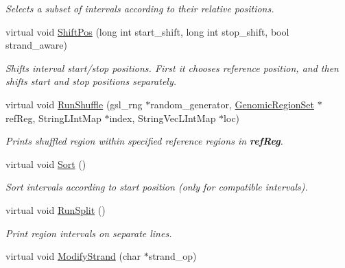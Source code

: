 \begin{CompactItemize}
\begin{CompactList}\small\item\em Selects a subset of intervals according to their relative positions. \item\end{CompactList}\item 
virtual void \hyperlink{classGenomicRegion_0ee8c165839c79afdc586f8b5e07788e}{ShiftPos} (long int start\_\-shift, long int stop\_\-shift, bool strand\_\-aware)
\begin{CompactList}\small\item\em Shifts interval start/stop positions. First it chooses reference position, and then shifts start and stop positions separately. \item\end{CompactList}\item 
\hypertarget{classGenomicRegion_b2c52ae40b34f3607f4558add94c25fd}{
virtual void \hyperlink{classGenomicRegion_b2c52ae40b34f3607f4558add94c25fd}{RunShuffle} (gsl\_\-rng $\ast$random\_\-generator, \hyperlink{classGenomicRegionSet}{GenomicRegionSet} $\ast$refReg, StringLIntMap $\ast$index, StringVecLIntMap $\ast$loc)}
\label{classGenomicRegion_b2c52ae40b34f3607f4558add94c25fd}

\begin{CompactList}\small\item\em Prints shuffled region within specified reference regions in {\bf refReg}. \item\end{CompactList}\item 
\hypertarget{classGenomicRegion_03959dc5b5695d817b5a40b47f30a4aa}{
virtual void \hyperlink{classGenomicRegion_03959dc5b5695d817b5a40b47f30a4aa}{Sort} ()}
\label{classGenomicRegion_03959dc5b5695d817b5a40b47f30a4aa}

\begin{CompactList}\small\item\em Sort intervals according to start position (only for compatible intervals). \item\end{CompactList}\item 
\hypertarget{classGenomicRegion_1686d4f4d2962b22d506a25a5887c31c}{
virtual void \hyperlink{classGenomicRegion_1686d4f4d2962b22d506a25a5887c31c}{RunSplit} ()}
\label{classGenomicRegion_1686d4f4d2962b22d506a25a5887c31c}

\begin{CompactList}\small\item\em Print region intervals on separate lines. \item\end{CompactList}\item 
\hypertarget{classGenomicRegion_e19cd6eaa883e6517ba12567cd756320}{
virtual void \hyperlink{classGenomicRegion_e19cd6eaa883e6517ba12567cd756320}{ModifyStrand} (char $\ast$strand\_\-op)}
\label{classGenomicRegion_e19cd6eaa883e6517ba12567cd756320}


\end{CompactItemize}

